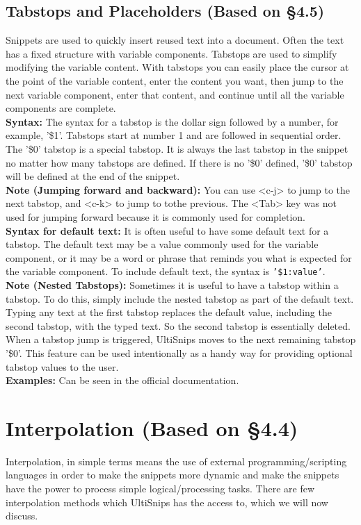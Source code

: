 \documentclass[11pt]{article}
\theoremstyle{plain}%
\theoremstyle{definition}
\theoremstyle{remark}
\begin{document}
	\subsection{Tabstops and Placeholders (Based on \S4.5)}
	Snippets are used to quickly insert reused text into a document. Often the text has a fixed structure with variable components. Tabstops are used to simplify modifying the variable content. With tabstops you can easily place the cursor at the point of the variable content, enter the content you want, then jump to the next variable component, enter that content, and continue until all the variable components are complete.\\
	\textbf{Syntax:} The syntax for a tabstop is the dollar sign followed by a number, for example, '\$1'. Tabstops start at number 1 and are followed in sequential order. The '\$0' tabstop is a special tabstop. It is always the last tabstop in the snippet no matter how many tabstops are defined. If there is no '\$0' defined, '\$0' tabstop will be defined at the end of the snippet.\\
	\textbf{Note (Jumping forward and backward):} You can use <c-j> to jump to the next tabstop, and <c-k> to jump to tothe previous. The <Tab> key was not used for jumping forward because it is commonly used for completion.\\
	\textbf{Syntax for default text:} It is often useful to have some default text for a tabstop. The default text may be a value commonly used for the variable component, or it may be a word or phrase that reminds you what is expected for the variable component. To include default text, the syntax is \texttt{'\${1:value}'}.\\
	\textbf{Note (Nested Tabstops):} Sometimes it is useful to have a tabstop within a tabstop. To do this, simply include the nested tabstop as part of the default text. \\
	Typing any text at the first tabstop replaces the default value, including the second tabstop, with the typed text. So the second tabstop is essentially deleted. When a tabstop jump is triggered, UltiSnips moves to the next remaining tabstop '\$0'. This feature can be used intentionally as a handy way for providing optional tabstop values to the user.\\
	\textbf{Examples:} Can be seen in the official documentation.
	\section{Interpolation (Based on \S4.4)}
	Interpolation, in simple terms means the use of external programming/scripting languages in order to make the snippets more dynamic and make the snippets have the power to process simple logical/processing tasks. There are few interpolation methods which UltiSnips has the access to, which we will now discuss.
\end{document}
